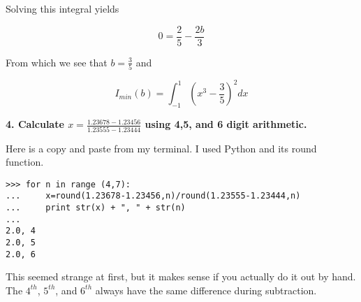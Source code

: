 \documentclass[a4paper,12pt]{article}
\begin{document}
Solving this integral yields

\begin{equation}
0 = \frac{2}{5}-\frac{2b}{3}
\end{equation}

From which we see that $b=\frac{3}{5}$ and 

\begin{equation}
I_{min}(b)=\int_{-1}^1(x^3-\frac{3}{5})^2 dx
\end{equation}

\vfil\eject

\vspace{2mm}

{\bf 4. Calculate $x=\frac{1.23678-1.23456}{1.23555-1.23444}$ using 4,5, and 6 digit arithmetic.}

Here is a copy and paste from my terminal. I used Python and its round function.

\begin{verbatim}
>>> for n in range (4,7):
...     x=round(1.23678-1.23456,n)/round(1.23555-1.23444,n)
...     print str(x) + ", " + str(n)
... 
2.0, 4
2.0, 5
2.0, 6
\end{verbatim}

This seemed strange at first, but it makes sense if you actually do it out by hand. The $4^{th}$, $5^{th}$, and $6^{th}$ always have the same difference during subtraction. 
\end{document}
